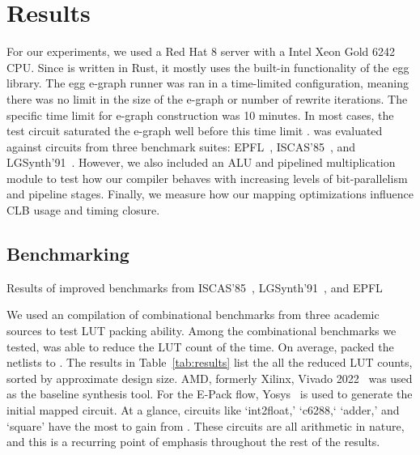 \section{Results}\label{sec:results}
For our experiments, we used a Red Hat 8 server with a Intel Xeon Gold 6242
CPU. Since \shortname{} is written in Rust, it mostly uses the built-in
functionality of the egg library. The egg e-graph runner was ran in a
time-limited configuration, meaning there was no limit in the size of the
e-graph or number of rewrite iterations. The specific time limit for e-graph
construction was 10 minutes. In most cases, the test circuit saturated the
e-graph well before this time limit .
\shortname{} was evaluated against circuits from three benchmark suites:
EPFL~\cite{epflbench}, ISCAS'85~\cite{iscasbench}, and
LGSynth'91~\cite{lgsynthbench}. However, we also included an ALU and pipelined
multiplication module to test how our compiler behaves with increasing levels
of bit-parallelism and pipeline stages. Finally, we measure how our mapping
optimizations influence CLB usage and timing closure.

\subsection{Benchmarking}\label{sec:results:benchmark}
\begin{table}
    \centering
    \caption{Results of \nimproved{} improved benchmarks from ISCAS'85~\cite{iscasbench}, LGSynth'91~\cite{lgsynthbench}, and EPFL~\cite{epflbench}}\label{tab:results}
\end{table}

We used an compilation of \nbenchmarks{} combinational benchmarks from three
academic sources to test LUT packing ability. Among the combinational
benchmarks we tested, \shortname{} was able to reduce the LUT count \fmetric{}
of the time. On average, \shortname{} packed the netlists to \metric{}. The
results in Table~\ref{tab:results} list the all the reduced LUT counts, sorted
by approximate design size. AMD, formerly Xilinx, Vivado 2022~\cite{vivado} was
used as the baseline synthesis tool. For the E-Pack flow, Yosys~\cite{yosys} is
used to generate the initial mapped circuit. At a glance, circuits like
`int2float,' `c6288,` `adder,' and `square' have the most to gain from
\shortname{}. These circuits are all arithmetic in nature, and this is a
recurring point of emphasis throughout the rest of the results.

